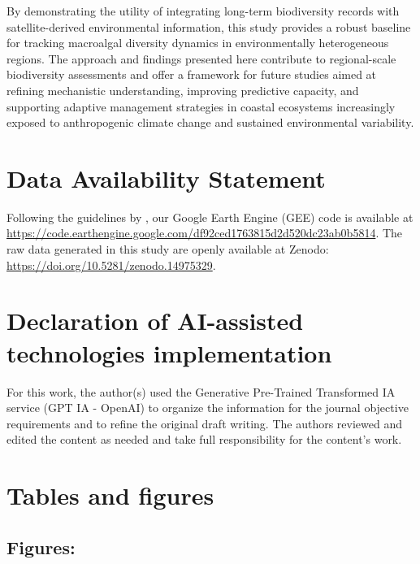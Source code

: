 \documentclass[a4paper,fleqn]{cas-sc}
\begin{document}
By demonstrating the utility of integrating long-term biodiversity records with satellite-derived environmental information, this study provides a robust baseline for tracking macroalgal diversity dynamics in environmentally heterogeneous regions. The approach and findings presented here contribute to regional-scale biodiversity assessments and offer a framework for future studies aimed at refining mechanistic understanding, improving predictive capacity, and supporting adaptive management strategies in coastal ecosystems increasingly exposed to anthropogenic climate change and sustained environmental variability.

\section{Data Availability Statement}  
Following the guidelines by \cite{Huettmann2023}, our Google Earth Engine (GEE) code is available at \url{https://code.earthengine.google.com/df92ced1763815d2d520dc23ab0b5814}. 
The raw data generated in this study are openly available at Zenodo: \url{https://doi.org/10.5281/zenodo.14975329}.  

%




\section{Declaration of AI-assisted technologies implementation}
For this work, the author(s) used the Generative Pre-Trained Transformed IA service (GPT IA - OpenAI) to organize the information for the journal objective requirements and to refine the original draft writing. The authors reviewed and edited the content as needed and take full responsibility for the content's work.

\section{Tables and figures} 
\subsection{Figures:}
\end{document}

